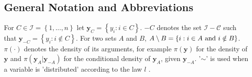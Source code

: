 \subsection{General Notation and Abbreviations}
For $C\in\mathcal{I}=\left\lbrace1,...,n\right\rbrace$ let $\pmb{y}_C=\left\lbrace y_i:i\in C\right\rbrace$. $-C$ denotes the set $\mathcal{I-C}$ such that $\pmb{y}_{-C}=\left\lbrace y_i:i\notin C\right\rbrace$. For two sets $A$ and $B$, $A\setminus B=\left\lbrace i:i\in A \hbox{ and } i \notin B\right\rbrace$. \\
$\pi\left(\cdot\right)$ denotes the density of its arguments, for example $\pi\left(\pmb{y}\right)$ for the density of $\pmb{y}$ and $\pi\left(\pmb{y}_A|\pmb{y}_{-A}\right)$ for the conditional density of $\pmb{y}_A$, given $\pmb{y}_{-A}$. '$\sim$' is used when a variable is 'distributed' according to the law $l$ \autocite[][16]{rue2005gaussian}.
